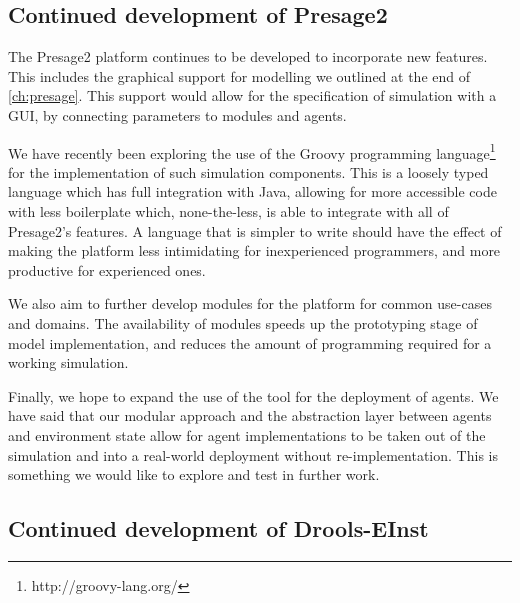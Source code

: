
\subsection{Continued development of Presage2}

The Presage2 platform continues to be developed to incorporate new features.
This includes the graphical support for modelling we outlined at the end of
\autoref{ch:presage}. This support would allow for the specification of
simulation with a \ac{GUI}, by connecting parameters to modules and agents.

We have recently been exploring the use of the Groovy programming language\footnote{http://groovy-lang.org/} for
the implementation of such simulation components. This is a loosely typed language
which has full integration with Java, allowing for more accessible code with
less boilerplate which, none-the-less, is able to integrate with all of
Presage2's features. A language that is simpler to write should have the effect of
making the platform less intimidating for inexperienced programmers, and more
productive for experienced ones.

We also aim to further develop modules for the platform for common use-cases
and domains. The availability of modules speeds up the prototyping stage of
model implementation, and reduces the amount of programming required for a
working simulation.

Finally, we hope to expand the use of the tool for the deployment of agents.
We have said that our modular approach and the abstraction layer between
agents and environment state allow for agent implementations to be taken out
of the simulation and into a real-world deployment without re-implementation.
This is something we would like to explore and test in further work.

\subsection{Continued development of Drools-EInst}


